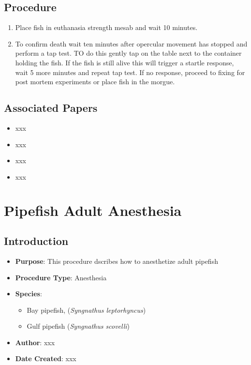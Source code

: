 \documentclass[
  letterpaper,
  DIV=11,
  numbers=noendperiod]{scrreprt}
\providecommand{\tightlist}{%
  \setlength{\itemsep}{0pt}\setlength{\parskip}{0pt}}\usepackage{longtable,booktabs,array}
\begin{document}
\hypertarget{procedure-58}{%
\section{Procedure}\label{procedure-58}}

\begin{enumerate}
\def\labelenumi{\arabic{enumi}.}
\tightlist
\item
  Place fish in euthanasia strength mesab and wait 10 minutes.
\item
  To confirm death wait ten minutes after opercular movement has stopped
  and perform a tap test. TO do this gently tap on the table next to the
  container holding the fish. If the fish is still alive this will
  trigger a startle response, wait 5 more minutes and repeat tap test.
  If no response, proceed to fixing for post mortem experiments or place
  fish in the morgue.
\end{enumerate}

\hypertarget{associated-papers-38}{%
\section{Associated Papers}\label{associated-papers-38}}

\begin{itemize}
\tightlist
\item
  xxx
\item
  xxx
\item
  xxx
\item
  xxx
\end{itemize}

\hypertarget{sec-husbandry_anesth_pipefish}{%
\chapter{Pipefish Adult
Anesthesia}\label{sec-husbandry_anesth_pipefish}}

\hypertarget{introduction-61}{%
\section{Introduction}\label{introduction-61}}

\begin{itemize}
\tightlist
\item
  \textbf{Purpose}: This procedure dscribes how to anesthetize adult
  pipefish
\item
  \textbf{Procedure Type}: Anesthesia
\item
  \textbf{Species}:

  \begin{itemize}
  \tightlist
  \item
    Bay pipefish, (\emph{Syngnathus leptorhyncus})
  \item
    Gulf pipefish (\emph{Syngnathus scovelli})
  \end{itemize}
\item
  \textbf{Author}: xxx
\item
  \textbf{Date Created}: xxx
\end{itemize}
\end{document}
